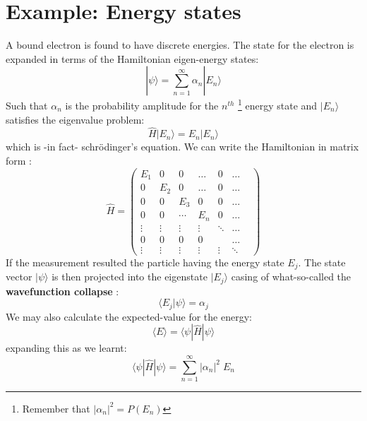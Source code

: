      \section{Example: Energy states}
     A bound electron is found to have discrete energies. The state for the electron is expanded in terms of the Hamiltonian eigen-energy states:
     \begin{equation}
     | \psi \rangle = \sum_{n=1}^\infty \alpha_n  | E_n \rangle 
     \end{equation} 
     Such that $ \alpha_n$ is the probability amplitude for the $n^{th}$ \footnote{Remember that $| \alpha_n|^2= P(E_n)$} energy state and $|E_n \rangle$ satisfies the eigenvalue problem:
     \begin{equation}
     \hat{H} |E_n \rangle = E_n |E_n \rangle
     \end{equation}
     which is -in fact- schr\"{o}dinger's equation. We can write the Hamiltonian in matrix form :
     \begin{equation}
     \hat{H} =\begin{pmatrix}           
     E_1 & 0 & 0 & \dots & 0 &\dots \\
     0 & E_2 & 0 & \dots & 0 & \dots\\
     0 & 0 & E_3 & 0 & 0 & \dots\\
     0 & 0 & \cdots & E_n& 0 & \dots\\
     \vdots & \vdots & \vdots & \vdots  & \ddots  & \dots\\
     0 & 0 & 0 & 0 &  &\dots &  \\
     \vdots & \vdots & \vdots & \vdots & \vdots  &\ddots \end{pmatrix}
     \end{equation}
     If the measurement resulted the particle having the energy state $ E_j$. The state vector $ | \psi \rangle $ is then projected into the eigenstate $ | E_j \rangle$ casing of what-so-called the \textbf{wavefunction collapse }:
     \begin{equation}
     \langle E_j | \psi \rangle =  \alpha_j 
     \end{equation}
     We may also calculate the expected-value for the energy:
     \begin{equation}
     \langle E \rangle = \langle \psi | \hat{H} | \psi \rangle 
     \end{equation}
     expanding this as we learnt:
     \begin{equation}
     \langle \psi | \hat{H} | \psi \rangle  = \sum_{n=1} ^\infty |\alpha_n|^2\;  E_n 
     \end{equation}
